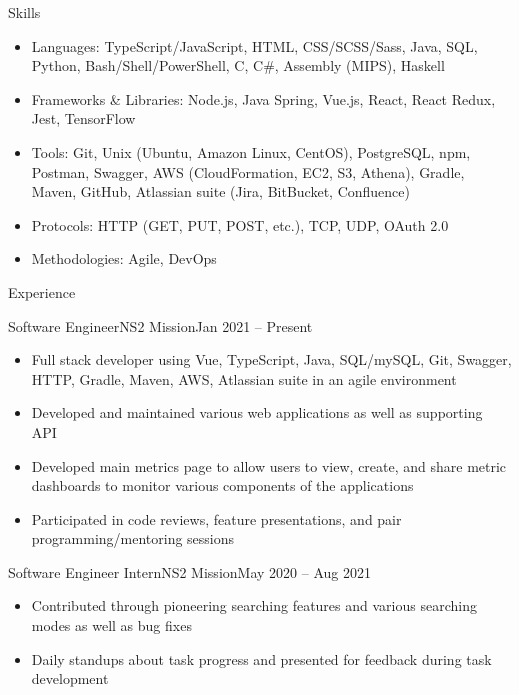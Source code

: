 \documentclass[]{mcdowellcv}
\begin{document}
	\makeheader
	
	\begin{cvsection}{Skills}
		\begin{cvsubsection}{}{}{}	
			\begin{itemize}
				\item Languages: TypeScript/JavaScript, HTML, CSS/SCSS/Sass, Java, SQL, Python, Bash/Shell/PowerShell, C, C\#, Assembly (MIPS), Haskell
				\item Frameworks \& Libraries: Node.js, Java Spring, Vue.js, React, React Redux, Jest, TensorFlow
				\item Tools: Git, Unix (Ubuntu, Amazon Linux, CentOS), PostgreSQL, npm, Postman, Swagger, AWS (CloudFormation, EC2, S3, Athena), Gradle, Maven, GitHub, Atlassian suite (Jira, BitBucket, Confluence)
				\item Protocols: HTTP (GET, PUT, POST, etc.), TCP, UDP, OAuth 2.0
				\item Methodologies: Agile, DevOps
			\end{itemize}
		\end{cvsubsection}
	\end{cvsection}

	\begin{cvsection}{Experience}
		\begin{cvsubsection}{Software Engineer}{NS2 Mission}{Jan 2021 -- Present}	
			\begin{itemize}
				\item Full stack developer using Vue, TypeScript, Java, SQL/mySQL, Git, Swagger, HTTP, Gradle, Maven, AWS, Atlassian suite in an agile environment
				\item Developed and maintained various web applications as well as supporting API
				\item Developed main metrics page to allow users to view, create, and share metric dashboards to monitor various components of the applications
				\item Participated in code reviews, feature presentations, and pair programming/mentoring sessions
			\end{itemize}
		\end{cvsubsection}

		\begin{cvsubsection}{Software Engineer Intern}{NS2 Mission}{May 2020 -- Aug 2021}	
			\begin{itemize}
				\item Contributed through pioneering searching features and various searching modes as well as bug fixes
				\item Daily standups about task progress and presented for feedback during task development
			\end{itemize}
		\end{cvsubsection}
	\end{cvsection}
	
\end{document}

